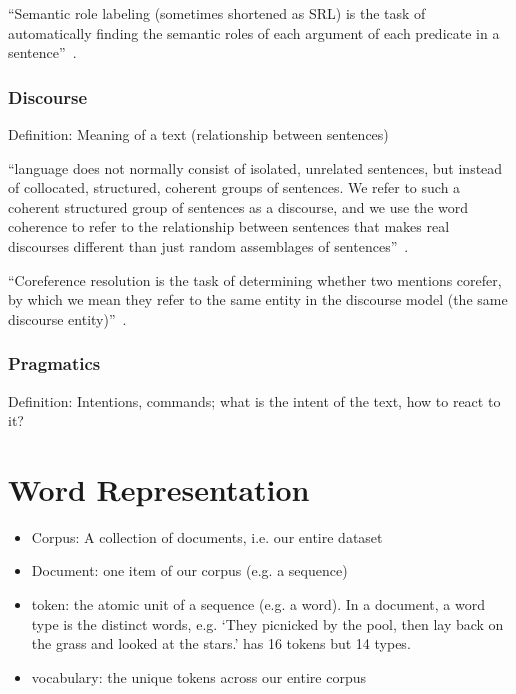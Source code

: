 \documentclass[11pt]{article}
\begin{document}
``Semantic role labeling (sometimes shortened as SRL) is the task of automatically finding the semantic roles of each argument of each predicate in a sentence''~\cite{book-speech-and-language-processing}.

\subsubsection{Discourse}

Definition: Meaning of a text (relationship between sentences)

``language does not normally consist of isolated, unrelated sentences, but instead of collocated, structured, coherent groups of sentences. We refer to such a coherent structured group of sentences as a discourse, and we use the word coherence to refer to the relationship between sentences that makes real discourses different than just random assemblages of sentences''~\cite{book-speech-and-language-processing}.

``Coreference resolution is the task of determining whether two mentions corefer, by which we mean they refer to the same entity in the discourse model (the same discourse entity)''~\cite{book-speech-and-language-processing}.

\subsubsection{Pragmatics}

Definition: Intentions, commands; what is the intent of the text, how to react to it?

\section{Word Representation}

\begin{itemize}
    \item Corpus: A collection of documents, i.e. our entire dataset
    \item Document: one item of our corpus (e.g. a sequence)
    \item token: the atomic unit of a sequence (e.g. a word). In a document, a word type is the distinct words, e.g. `They picnicked by the pool, then lay back on the grass and looked at the stars.' has 16 tokens but 14 types.
    \item vocabulary: the unique tokens across our entire corpus
\end{itemize}
\end{document}
